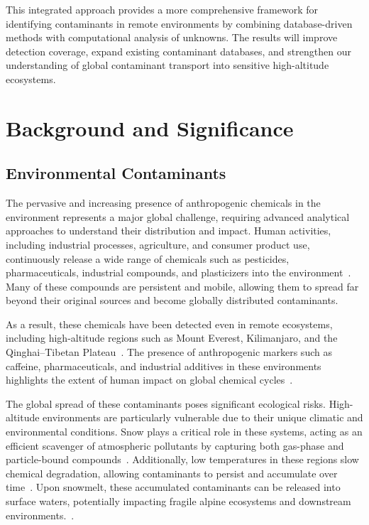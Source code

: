 \documentclass[11pt]{article}
\begin{document}
\begin{doublespace}
    This integrated approach provides a more comprehensive framework for identifying contaminants in remote environments by combining database-driven methods with computational analysis of unknowns.
    The results will improve detection coverage, expand existing contaminant databases, and strengthen our understanding of global contaminant transport into sensitive high-altitude ecosystems.

\section{Background and Significance}

    \subsection{Environmental Contaminants}
    The pervasive and increasing presence of anthropogenic chemicals in the environment represents a major global challenge, requiring advanced analytical approaches to understand their distribution and impact.
    Human activities, including industrial processes, agriculture, and consumer product use, continuously release a wide range of chemicals such as pesticides, pharmaceuticals, industrial compounds, and plasticizers into the environment~\cite{Manz, Blais2015, Wilkinson2022}.
    Many of these compounds are persistent and mobile, allowing them to spread far beyond their original sources and become globally distributed contaminants.

    As a result, these chemicals have been detected even in remote ecosystems, including high-altitude regions such as Mount Everest, Kilimanjaro, and the Qinghai–Tibetan Plateau~\cite{Daly2005, Xu2011, Ma2025, Catalan2015}.
    The presence of anthropogenic markers such as caffeine, pharmaceuticals, and industrial additives in these environments highlights the extent of human impact on global chemical cycles~\cite{Gray2022, NinoSuastegui2025}.

    The global spread of these contaminants poses significant ecological risks.
    High-altitude environments are particularly vulnerable due to their unique climatic and environmental conditions.
    Snow plays a critical role in these systems, acting as an efficient scavenger of atmospheric pollutants by capturing both gas-phase and particle-bound compounds~\cite{Herbert2006}.
    Additionally, low temperatures in these regions slow chemical degradation, allowing contaminants to persist and accumulate over time~\cite{Daly2005}.
    Upon snowmelt, these accumulated contaminants can be released into surface waters, potentially impacting fragile alpine ecosystems and downstream environments.~\cite{Meyer2008}.



\end{doublespace}
\end{document}
